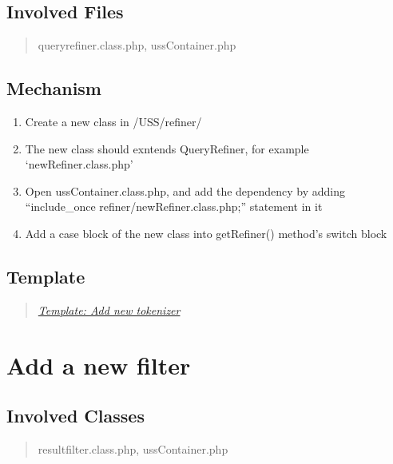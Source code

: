 \documentclass[letterpaper,10pt,english]{sphinxmanual}
\begin{document}
\subsection{Involved Files}
\label{docs/hooks/new_refiner:involved-files}\begin{quote}

queryrefiner.class.php, ussContainer.php
\end{quote}


\subsection{Mechanism}
\label{docs/hooks/new_refiner:mechanism}\begin{enumerate}
\item {} 
Create a new class in /USS/refiner/

\item {} 
The new class should exntends QueryRefiner, for example `newRefiner.class.php'

\item {} 
Open ussContainer.class.php, and add the dependency by adding ``include\_once refiner/newRefiner.class.php;'' statement in it

\item {} 
Add a case block of the new class into getRefiner() method's switch block

\end{enumerate}


\subsection{Template}
\label{docs/hooks/new_refiner:template}\begin{quote}

{\hyperref[docs/hooks/t_tokenizer:hook-template-uss]{\emph{Template: Add new tokenizer}}}
\end{quote}


\section{Add a new filter}
\label{docs/hooks/new_filter:hook-filter}\label{docs/hooks/new_filter::doc}\label{docs/hooks/new_filter:add-a-new-filter}

\subsection{Involved Classes}
\label{docs/hooks/new_filter:involved-classes}\begin{quote}

resultfilter.class.php, ussContainer.php
\end{quote}
\end{document}
